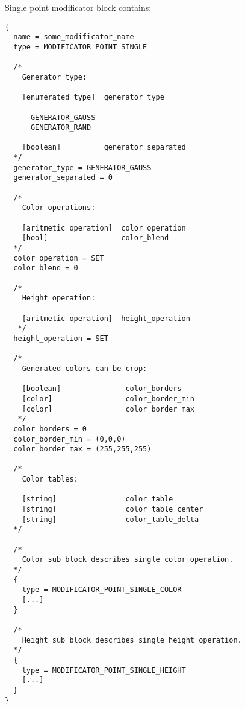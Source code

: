 \documentclass[9pt]{article}
\begin{document}
Single point modificator block contains:
\begin{verbatim}
{
  name = some_modificator_name
  type = MODIFICATOR_POINT_SINGLE

  /*    
    Generator type:
  
    [enumerated type]  generator_type
            
      GENERATOR_GAUSS
      GENERATOR_RAND
      
    [boolean]          generator_separated     
  */
  generator_type = GENERATOR_GAUSS
  generator_separated = 0
    
  /*
    Color operations:
    
    [aritmetic operation]  color_operation        
    [bool]                 color_blend
  */      
  color_operation = SET
  color_blend = 0
  
  /*
    Height operation:
    
    [aritmetic operation]  height_operation
   */
  height_operation = SET

  /*
    Generated colors can be crop:
  
    [boolean]               color_borders
    [color]                 color_border_min
    [color]                 color_border_max
   */
  color_borders = 0
  color_border_min = (0,0,0)
  color_border_max = (255,255,255)
  
  /*
    Color tables:
          
    [string]                color_table
    [string]                color_table_center
    [string]                color_table_delta    
  */
  
  /*
    Color sub block describes single color operation.
  */
  {
    type = MODIFICATOR_POINT_SINGLE_COLOR
    [...]
  }
  
  /*
    Height sub block describes single height operation.
  */
  {
    type = MODIFICATOR_POINT_SINGLE_HEIGHT
    [...]
  }
}
\end{verbatim}
\end{document}
